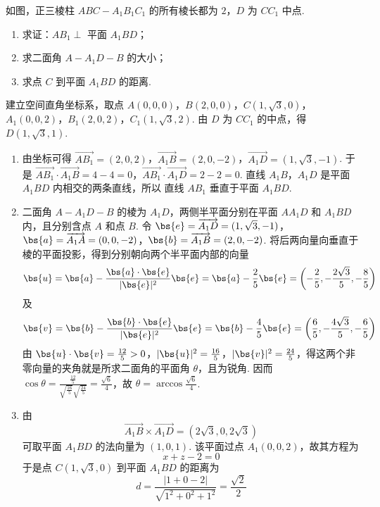\begin{problem}
如图，正三棱柱 \(ABC - A_{1}B_{1}C_{1}\) 的所有棱长都为 \(2\)，\(D\) 为 \(CC_{1}\) 中点.

\begin{enumerate}
\item 求证：\(AB_{1} \perp\) 平面 \(A_{1}BD\)；
\item 求二面角 \(A - A_1D - B\) 的大小；
\item 求点 \(C\) 到平面 \(A_{1}BD\) 的距离.
\end{enumerate}

\end{problem}

\begin{solution}
建立空间直角坐标系，取点 \(A(0,0,0)\)，\(B(2,0,0)\)，\(C(1,\sqrt{3},0)\)，\(A_{1}(0,0,2)\)，\(B_{1}(2,0,2)\)，\(C_{1}(1,\sqrt{3},2)\).
由 \(D\) 为 \(CC_{1}\) 的中点，得 \(D(1,\sqrt{3},1)\).

\begin{enumerate}
\item 由坐标可得
\(\overrightarrow{AB_{1}}=(2,0,2)\)，\(\overrightarrow{A_{1}B}=(2,0,-2)\)，\(\overrightarrow{A_{1}D}=(1,\sqrt{3},-1)\). 于是 \(\overrightarrow{AB_{1}}\cdot\overrightarrow{A_{1}B}=4-4=0\)，\(\overrightarrow{AB_{1}}\cdot\overrightarrow{A_{1}D}=2-2=0\).
直线 \(A_{1}B\)，\(A_{1}D\) 是平面 \(A_{1}BD\) 内相交的两条直线，所以
直线 \(AB_{1}\) 垂直于平面 \(A_{1}BD\).

\item 二面角 \(A-A_1D-B\) 的棱为 \(A_1D\)，两侧半平面分别在平面 \(AA_1D\) 和 \(A_1BD\) 内，且分别含点 \(A\) 和点 \(B\). 令 \(\bs{e}=\overrightarrow{A_1D}=(1,\sqrt{3},-1)\)，\(\bs{a}=\overrightarrow{A_1A}=(0,0,-2)\)，\(\bs{b}=\overrightarrow{A_1B}=(2,0,-2)\). 将后两向量向垂直于棱的平面投影，得到分别朝向两个半平面内部的向量
\[
\bs{u}=\bs{a}-\frac{\bs{a}\cdot\bs{e}}{|\bs{e}|^2}\bs{e}
=\bs{a}-\frac{2}{5}\bs{e}
=\left(-\frac{2}{5},-\frac{2\sqrt{3}}{5},-\frac{8}{5}\right)
\]
及
\[
\bs{v}=\bs{b}-\frac{\bs{b}\cdot\bs{e}}{|\bs{e}|^2}\bs{e}
=\bs{b}-\frac{4}{5}\bs{e}
=\left(\frac{6}{5},-\frac{4\sqrt{3}}{5},-\frac{6}{5}\right)
\]
由 \(\bs{u}\cdot\bs{v}=\frac{12}{5}>0\)，\(|\bs{u}|^2=\frac{16}{5}\)，\(|\bs{v}|^2=\frac{24}{5}\)，得这两个非零向量的夹角就是所求二面角的平面角 \(\theta\)，且为锐角. 因而 \(\cos\theta=\frac{\frac{12}{5}}{\sqrt{\frac{16}{5}}\sqrt{\frac{24}{5}}}=\frac{\sqrt{6}}{4}\)，故 \(\theta=\arccos\frac{\sqrt{6}}{4}\).

\item 由
\[
\overrightarrow{A_{1}B}\times\overrightarrow{A_{1}D}=(2\sqrt{3},0,2\sqrt{3})
\]
可取平面 \(A_{1}BD\) 的法向量为 \((1,0,1)\). 该平面过点 \(A_{1}(0,0,2)\)，故其方程为
\[
x+z-2=0
\]
于是点 \(C(1,\sqrt{3},0)\) 到平面 \(A_{1}BD\) 的距离为
\[
d=\frac{|1+0-2|}{\sqrt{1^{2}+0^{2}+1^{2}}}=\frac{\sqrt{2}}{2}
\]
\end{enumerate}
\end{solution}

